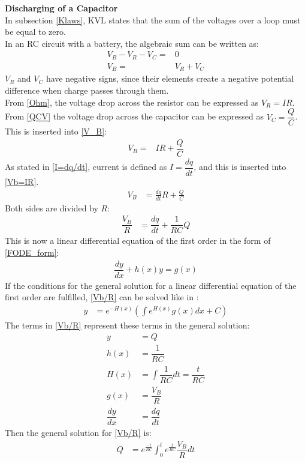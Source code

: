 \textbf{Discharging of a Capacitor}\\
In subsection \ref{Klaws}, KVL states that the sum of the voltages over a loop must be equal to zero. 
\\
In an RC circuit with a battery, the algebraic sum can be written as:
\begin{align}
V_B-V_R-V_C =& 0 \nonumber \\
V_B=&V_R+V_C \label{V_B}
\end{align}
$V_R$ and $V_C$ have negative signs, since their elements create a negative potential difference when charge passes through them.
\\
From \eqref{Ohm}, the voltage drop across the resistor can be expressed as $V_R=IR$. From \eqref{QCV} the voltage drop across the capacitor can be expressed as $V_C=\dfrac{Q}{C}$. This is inserted into \eqref{V_B}:
\begin{align}
V_B =& IR+\dfrac{Q}{C} \label{Vb=IR}
\end{align}
As stated in \eqref{I=dq/dt}, current is defined as $I =\dfrac{dq}{dt}$, and this is inserted into \eqref{Vb=IR}.
 \begin{align*}
 	V_B &= \frac{dq}{dt} R + \frac{Q}{C}
 \end{align*}
Both sides are divided by $R$:
\begin{align}
\dfrac{V_B}{R} &= \dfrac{dq}{dt} + \dfrac{1}{RC}Q\label{Vb/R} 
\end{align}
This is now a linear differential equation of the first order in the form of \eqref{FODE_form}:
\begin{align*}
\dfrac{dy}{dx}+h(x)y=g(x)
\end{align*}
If the conditions for the general solution for a linear differential equation of the first order are fulfilled, \eqref{Vb/R} can be solved like in :
\begin{align*}
y&=e^{-H(x)}\left(\int e^{H(x)}g(x)dx+C\right)
\end{align*}
The terms in \eqref{Vb/R} represent these terms in the general solution:
\begin{align*}
y &= Q
\\
h(x) &= \dfrac{1}{RC}
\\
H(x) &= \int \dfrac{1}{RC}dt=\dfrac{t}{RC}
\\
g(x) &= \dfrac{V_B}{R}
\\
\dfrac{dy}{dx} &= \dfrac{dq}{dt}
\end{align*}
Then the general solution for \eqref{Vb/R} is:
\begin{align*}
Q&= e^{\frac{-t}{RC}}\int_{0}^{t}e^{\frac{t}{RC}}\dfrac{V_B}{R}dt
\end{align*}
